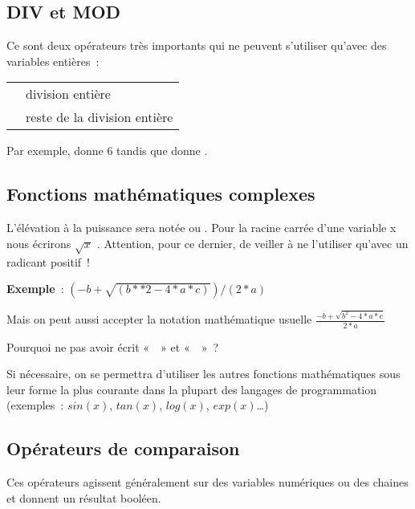 		\subsection{DIV et MOD}
	
			Ce sont deux opérateurs très importants qui ne peuvent s’utiliser
			qu’avec des variables entières~:
	
			\begin{center}
			\begin{tabular}{m{1cm}|m{12cm}}
			\raggedleft  \pseudocode{DIV} & division entière\\
			\raggedleft  \pseudocode{MOD} & reste de la division entière\\
			\end{tabular}
			\end{center}
	
			Par exemple,  donne 6 tandis que
			 donne .
	
		\subsection{Fonctions mathématiques complexes}
	
			L’élévation à la puissance sera notée \pseudocode{**} ou
			\pseudocode{\^{}} . Pour la racine carrée d’une variable x nous
			écrirons  $\sqrt{x}$ \textit{.} Attention, pour ce dernier, de veiller
			à ne l’utiliser qu’avec un radicant positif~!
	
			\textbf{Exemple}~: 
			$(-b+\sqrt{(b\ast \ast 2-4\ast a\ast c)})/(2\ast a)$
			
			Mais on peut aussi accepter la notation mathématique usuelle
			$\frac{-b+\sqrt{b^{2}-4\ast a\ast c}}{2\ast a}$ 
	
			Pourquoi ne pas avoir écrit «~~» et
			«~~»~?
	
			Si nécessaire, on se permettra d’utiliser les autres
			fonctions mathématiques sous leur forme la plus courante dans la
			plupart des langages de programmation (exemples~:
			$sin(x)$, $tan(x)$, $log(x)$, $exp(x)$\dots)
			
		
		\subsection{Opérateurs de comparaison}
	
			Ces opérateurs agissent généralement sur des variables numériques ou des
			chaines et donnent un résultat booléen.
	
